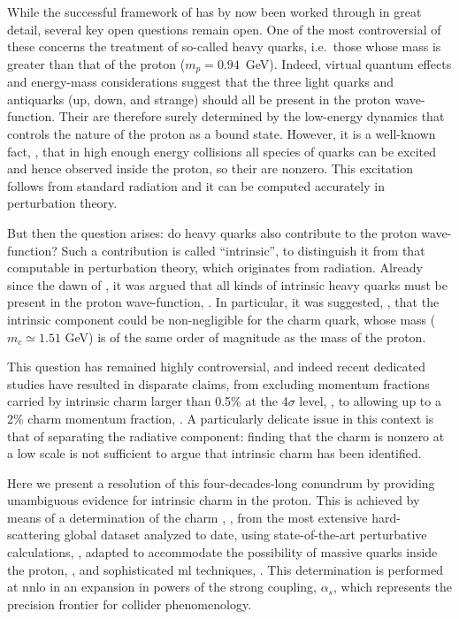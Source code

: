 
While the successful framework of \pdfs has by now been worked through in great
detail, several key open questions remain open.
%
One of the most controversial of these concerns the treatment of so-called
heavy quarks, i.e.\ those whose mass is greater than that of the proton
($m_p=0.94$~GeV). Indeed, virtual quantum effects and energy-mass
considerations suggest that the three light quarks and antiquarks (up,  down,
and strange) should all be present in the proton wave-function.
%
Their \pdfs are therefore surely determined by the low-energy dynamics that
controls the nature of the proton as a bound state.
%
However, it is a well-known fact,
\cite{DeRoeck:2011na,Kovarik:2019xvh,Gao:2017yyd,Rojo:2019uip}, that in high
enough energy collisions all species of quarks can be excited and hence
observed inside the proton, so their \pdfs are nonzero.
%
This excitation follows from standard \qcd radiation and it can be computed
accurately in perturbation theory.

But then the question arises: do heavy quarks also contribute to the proton
wave-function? Such a contribution is called \enquote{intrinsic}, to
distinguish it from that computable in perturbation theory, which originates
from \qcd radiation.
%
Already since the dawn of \qcd, it was argued that all kinds of intrinsic heavy
quarks must be present in the proton wave-function, \cite{Brodsky:1984nx}.
%
In particular, it was suggested, \cite{Brodsky:1980pb}, that the intrinsic
component could be non-negligible for the charm quark, whose mass ($m_c\simeq
1.51$ GeV) is of the same order of magnitude as the mass of the proton.

This question has remained highly controversial, and indeed recent dedicated
studies have resulted in disparate claims, from excluding momentum fractions
carried by intrinsic  charm larger than 0.5\% at the 4$\sigma$ level,
\cite{Jimenez-Delgado:2014zga}, to allowing up to a 2\% charm momentum
fraction, \cite{Hou:2017khm}.
%
A particularly delicate issue in this context is that of separating the
radiative component: finding that the charm \pdf is nonzero at a low scale is
not sufficient to argue that intrinsic charm has been identified.

Here we present a resolution of this four-decades-long conundrum by providing
unambiguous evidence for intrinsic charm  in the proton.
%
This is achieved by means of a determination of the charm \pdf,
\cite{Ball:2021leu}, from the most extensive hard-scattering  global dataset
analyzed to date, using state-of-the-art perturbative \qcd calculations,
\cite{Heinrich:2020ybq}, adapted to accommodate the possibility of massive
quarks inside the proton, \cite{Forte:2010ta,Ball:2015dpa,Ball:2015tna}, and
sophisticated \acrfull{ml} techniques,
\cite{Ball:2016neh,Ball:2017nwa,Ball:2021leu}. 
This determination is performed at \acrfull{nnlo} in an expansion in powers of
the strong coupling, $\alpha_s$, which represents the precision frontier for
collider phenomenology.
%

